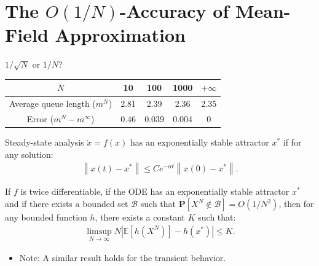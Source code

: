\documentclass{beamer}
\newcommand\esp[1]{\mathbb{E}\left[#1\right]}
\newcommand\calB{\mathcal{B}}
\newcommand\Proba[1]{\mathbf{P}\left[#1\right]}
\newcommand\norm[1]{\left\|#1\right\|}
\newcommand\abs[1]{\left|#1\right|}
\newcommand\bX{\mathbf{X}}
\begin{document}
\section{The $O(1/N)$-Accuracy of Mean-Field Approximation}

\begin{frame}{$1/\sqrt{N}$ or $1/N$?}


  \begin{center}
    \begin{tabular}{|c|c|c|c|c|}
      \hline
      $N$ & 10 & 100 & 1000 &$+\infty$\\\hline
      Average queue length ($m^N$) &2.81&2.39&2.36& 2.35\\\hline
      Error ($m^N-m^\infty$) & 0.46 & 0.039 & 0.004 & 0 \\\hline
    \end{tabular}
  \end{center}
\end{frame}




\begin{frame}{Steady-state analysis}
  $\dot{x}=f(x)$ has an exponentially stable attractor $x^*$ if for
  any solution:
  \begin{align*}
    \norm{x(t)-x^*} \le C e^{-\alpha t}\norm{x(0)-x^*}.  
  \end{align*}
  
  \pause
  \begin{theorem}
    If $f$ is twice differentiable, if the ODE has an exponentially
    stable attractor $x^*$ and if there exists a bounded set $\calB$
    such that $\Proba{X^N\not\in \calB}=O(1/N^2)$, then for any
    bounded function $h$, there exists a constant $K$ such that:
    \begin{align*}
      \limsup_{N\to\infty}N\abs{\esp{h(X^N)} - h(x^*)} \le 
      K.
    \end{align*}
  \end{theorem}
  \begin{itemize}
  \item Note: A similar result holds for the transient behavior.
  \end{itemize}

\end{frame}
\end{document}
